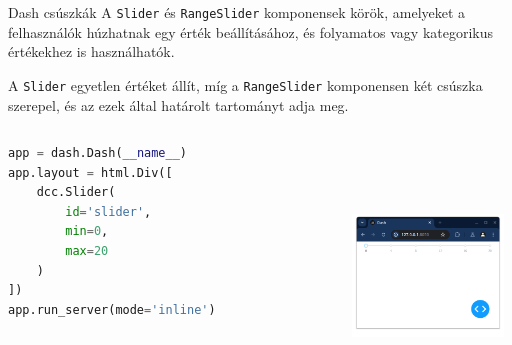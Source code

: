 \documentclass[english, aspectratio=169]{beamer}
\begin{document}
\begin{frame}[fragile]{Dash csúszkák}
	A \texttt{Slider} és \texttt{RangeSlider} komponensek körök, amelyeket a felhasználók húzhatnak egy érték beállításához, és folyamatos vagy kategorikus értékekhez is használhatók.\par\medskip
	A \texttt{Slider} egyetlen értéket állít, míg a \texttt{RangeSlider} komponensen két csúszka szerepel, és az ezek által határolt tartományt adja meg. 
	\begin{columns}
		\begin{column}{.5\textwidth}
			\begin{lstlisting}[language=python]
app = dash.Dash(__name__)
app.layout = html.Div([
	dcc.Slider(
		id='slider',
		min=0,
		max=20
	)
])
app.run_server(mode='inline')				
			\end{lstlisting}
		\end{column}
		\begin{column}{.5\textwidth}
			\begin{center}
				\includegraphics[width=4cm, height=7cm, keepaspectratio]{images/scatter_16.png}
			\end{center}
		\end{column}
	\end{columns}
\end{frame}
\end{document}
